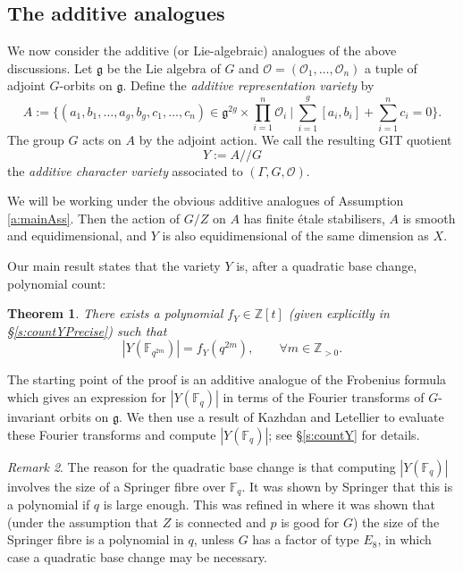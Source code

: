 \documentclass[12pt]{amsart}
\theoremstyle{plain}
\newtheorem{thm}{Theorem}
\theoremstyle{definition}
\theoremstyle{remark}
\newtheorem{rem}[thm]{Remark}
\newcommand{\bX}{{X}}
\newcommand{\bA}{{A}}
\newcommand{\bY}{{Y}}
\newcommand{\cO}{\mathcal{O}}
\newcommand{\Fq}{\mathbb{F}_q}
\newcommand{\fg}{\mathfrak{g}}
\begin{document}
\subsection{The additive analogues}\label{s:additive}  We now consider the additive (or Lie-algebraic) analogues of the above discussions. Let $\fg$ be the Lie algebra of $G$ and  ${\cO=(\cO_1,\ldots, \cO_n)}$ a tuple of adjoint $G$-orbits on $\fg$. Define the \emph{additive representation variety}  by  
\[
\bA :=  \bigg\{(a_1,b_1,\ldots,a_g,b_g, c_1,\ldots ,c_n)\in \fg^{2g}\times \prod_{i=1}^n \cO_i\ \bigg|\  
\sum_{i=1}^g [a_i,b_i]+\sum_{i=1}^n c_i = 0 \bigg\}.
\]
The group $G$ acts on $\bA$ by the adjoint action. 
We call the resulting GIT quotient  
\[
\bY:=\bA/\!\!/G
\]
the \emph{additive character variety} associated to $(\Gamma, G, \cO)$.


We will be working under the obvious additive analogues of Assumption \ref{a:mainAss}. Then the action of $G/Z$ on $\bA$ has finite \'etale stabilisers, $\bA$ is smooth and equidimensional,  and $\bY$ is also equidimensional of the same dimension as $\bX$. 

Our main result states that the variety $Y$ is, after a quadratic base change, polynomial count: 


\begin{thm} \label{t:countY}  There exists a polynomial $f_Y \in \mathbb{Z}[t]$ (given explicitly in \S \ref{s:countYPrecise}) such that 
\[
|Y(\mathbb{F}_{q^{2m}})| = f_Y(q^{2m}),\qquad \forall m\in \mathbb{Z}_{>0}. 
\] 
\end{thm} 


The starting point of the proof is an additive analogue of the Frobenius formula which gives an expression for $|\bY(\Fq)|$ in terms of the Fourier transforms of $G$-invariant orbits on $\fg$. We then use a result of Kazhdan and Letellier to evaluate these Fourier transforms and compute $|Y(\Fq)|$; see \S \ref{s:countY} for details. 


\begin{rem} The reason for the quadratic base change is that computing $|Y(\Fq)|$ involves the size of a Springer fibre over $\Fq$. It was shown by Springer that this is a polynomial if $q$ is large enough.  This was refined in \cite[Theorem 3.10]{GoodwinRohrle} where it was shown that  (under the assumption that $Z$ is connected and $p$ is good for $G$) the size of the Springer fibre is a polynomial in $q$, unless $G$ has a factor of type $E_8$, in which case a quadratic base change may be necessary. 
\end{rem} 
\end{document}
